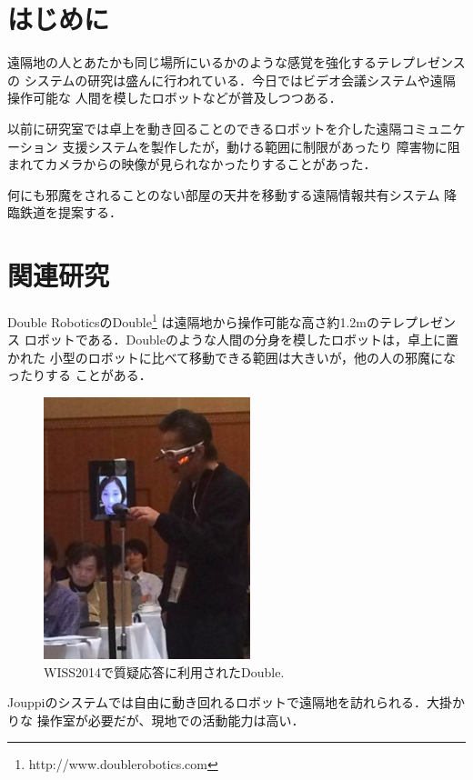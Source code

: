 \documentclass[submit,techreq]{ipsj}
\begin{document}
\section{はじめに}

遠隔地の人とあたかも同じ場所にいるかのような感覚を強化するテレプレゼンスの
システムの研究は盛んに行われている．今日ではビデオ会議システムや遠隔操作可能な
人間を模したロボットなどが普及しつつある．

以前に研究室では卓上を動き回ることのできるロボットを介した遠隔コミュニケーション
支援システムを製作したが\cite{Hirota:Korin}，動ける範囲に制限があったり
障害物に阻まれてカメラからの映像が見られなかったりすることがあった．

何にも邪魔をされることのない部屋の天井を移動する遠隔情報共有システム
降臨鉄道を提案する．

\section{関連研究}

Double RoboticsのDouble\footnote{
  \textsf{http://www.doublerobotics.com}
}
は遠隔地から操作可能な高さ約1.2mのテレプレゼンス
ロボットである．Doubleのような人間の分身を模したロボットは，卓上に置かれた
小型のロボットに比べて移動できる範囲は大きいが，他の人の邪魔になったりする
ことがある．

\begin{figure}[H]
\centerline{\includegraphics[width=60mm,bb=-100 0 241 306]{figures/b74f4564d4b38d12e48fcf80fef96def.png}}
\caption{WISS2014で質疑応答に利用されたDouble.}
\label{screenshot1}
\end{figure}

Jouppiのシステム\cite{Jouppi:2002:FST:587078.587128}では自由に動き回れるロボットで遠隔地を訪れられる．大掛かりな
操作室が必要だが、現地での活動能力は高い．
\end{document}
